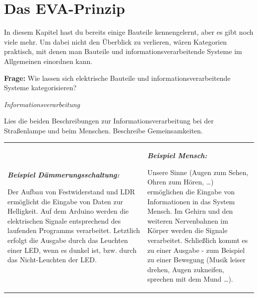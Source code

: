 \newpage
\section{Das EVA-Prinzip}
\label{sec:eva}

In diesem Kapitel hast du bereits einige Bauteile kennengelernt, aber es gibt noch viele mehr. Um dabei nicht den Überblick zu verlieren, wären Kategorien praktisch, mit denen man Bauteile und informationsverarbeitende Systeme im Allgemeinen einordnen kann.

\begin{ziel}
	\textbf{Frage:} Wie lassen sich elektrische Bauteile und informationsverarbeitende Systeme kategorisieren?
\end{ziel}

\begin{aufgabe} \emph{Informationsverarbeitung}
	
	Lies die beiden Beschreibungen zur Informationsverarbeitung bei der Straßenlampe und beim Menschen. Beschreibe Gemeinsamkeiten.
\end{aufgabe}

\bigskip

\begin{tabu} to \textwidth {X[L]X[L]}
	\emph{\bfseries Beispiel Dämmerungsschaltung:}
	
	Der Aufbau von Festwiderstand und LDR ermöglicht die Eingabe von Daten zur Helligkeit. Auf dem Arduino werden die elektrischen Signale entsprechend des laufenden Programms verarbeitet. Letztlich erfolgt die Ausgabe durch das Leuchten einer LED, wenn es dunkel ist, bzw. durch das Nicht-Leuchten der LED.
	
	&
	
	\emph{\bfseries Beispiel Mensch:}
	
	Unsere Sinne (Augen zum Sehen, Ohren zum Hören, \dots) ermöglichen die Eingabe von Informationen in das System Mensch. Im Gehirn und den weiteren Nervenbahnen im Körper werden die Signale verarbeitet. Schließlich kommt es zu einer Ausgabe - zum Beispiel zu einer Bewegung (Musik leiser drehen, Augen zukneifen, sprechen mit dem Mund \dots).
	\\
\end{tabu}

\bigskip

